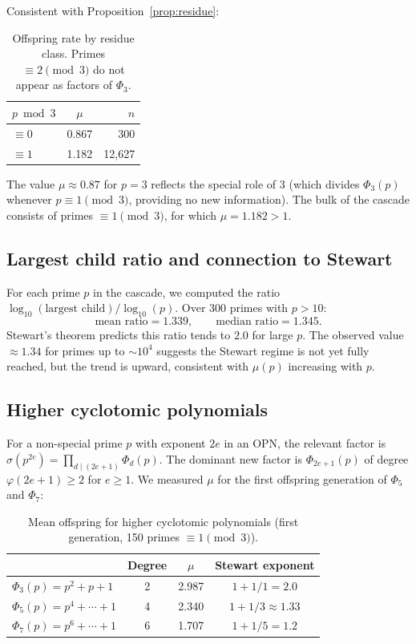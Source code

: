 \documentclass[11pt]{article}
\theoremstyle{definition}
\theoremstyle{remark}
\newcommand{\Phi}{\varPhi}
\begin{document}
Consistent with Proposition~\ref{prop:residue}:

\begin{table}[H]
\centering
\begin{tabular}{@{}lcr@{}}
\toprule
$p \bmod 3$ & $\mu$ & $n$ \\
\midrule
$\equiv 0$ & 0.867 & 300 \\
$\equiv 1$ & 1.182 & 12{,}627 \\
\bottomrule
\end{tabular}
\caption{Offspring rate by residue class. Primes $\equiv 2 \pmod{3}$ do not appear as factors of $\Phi_3$.}
\label{tab:residue}
\end{table}

The value $\mu \approx 0.87$ for $p = 3$ reflects the special role of $3$ (which divides $\Phi_3(p)$ whenever $p \equiv 1 \pmod{3}$, providing no new information). The bulk of the cascade consists of primes $\equiv 1 \pmod{3}$, for which $\mu = 1.182 > 1$.

\subsection{Largest child ratio and connection to Stewart}

For each prime $p$ in the cascade, we computed the ratio $\log_{10}(\text{largest child}) / \log_{10}(p)$. Over 300 primes with $p > 10$:
\[
\text{mean ratio} = 1.339, \qquad \text{median ratio} = 1.345.
\]
Stewart's theorem predicts this ratio tends to $2.0$ for large $p$. The observed value $\approx 1.34$ for primes up to $\sim 10^4$ suggests the Stewart regime is not yet fully reached, but the trend is upward, consistent with $\mu(p)$ increasing with $p$.

\subsection{Higher cyclotomic polynomials}

For a non-special prime $p$ with exponent $2e$ in an OPN, the relevant factor is $\sigma(p^{2e}) = \prod_{d \mid (2e+1)} \Phi_d(p)$. The dominant new factor is $\Phi_{2e+1}(p)$ of degree $\varphi(2e+1) \geq 2$ for $e \geq 1$. We measured $\mu$ for the first offspring generation of $\Phi_5$ and $\Phi_7$:

\begin{table}[H]
\centering
\begin{tabular}{@{}lccc@{}}
\toprule
& Degree & $\mu$ & Stewart exponent \\
\midrule
$\Phi_3(p) = p^2 + p + 1$ & 2 & 2.987 & $1 + 1/1 = 2.0$ \\
$\Phi_5(p) = p^4 + \cdots + 1$ & 4 & 2.340 & $1 + 1/3 \approx 1.33$ \\
$\Phi_7(p) = p^6 + \cdots + 1$ & 6 & 1.707 & $1 + 1/5 = 1.2$ \\
\bottomrule
\end{tabular}
\caption{Mean offspring for higher cyclotomic polynomials (first generation, 150 primes $\equiv 1 \pmod{3}$).}
\label{tab:multi}
\end{table}
\end{document}
